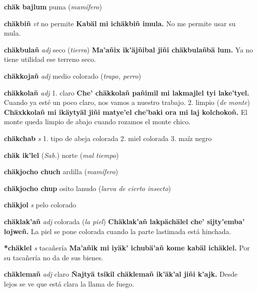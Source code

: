 \documentclass[10pt]{scrbook}
\newcommand{\entry}[1]{\textbf{#1}}
\newcommand{\onedefinition}[1]{#1.}
\newcommand{\partofspeech}[1]{\textit{#1}}
\newcommand{\spanishtranslation}[1]{#1}
\newcommand{\clarification}[1]{(\textit{#1})}
\newcommand{\cholexample}[1]{\textbf{#1}}
\newcommand{\exampletranslation}[1]{#1}
\newcommand{\relevantdialect}[1]{(\textit{#1})}
\begin{document}
\begin{multicols}{2}
\entry{chäk bajlum}
\spanishtranslation{puma}
\clarification{mamífero}

\entry{chäkbiñ}
\partofspeech{vt}
\spanishtranslation{no permite}
\cholexample{Kabäl mi ichäkbiñ imula.}
\exampletranslation{No me permite usar su mula.}

\entry{chäkbulañ}
\partofspeech{adj}
\spanishtranslation{seco}
\clarification{tierra}
\cholexample{Ma'añix ik'äjñibal jiñi chäkbulañbä lum.}
\exampletranslation{Ya no tiene utilidad ese terreno seco.}

\entry{chäkkojañ}
\partofspeech{adj}
\spanishtranslation{medio colorado}
\clarification{trapo, perro}

\entry{chäkkolañ}
\partofspeech{adj}
\onedefinition{1}
\spanishtranslation{claro}
\cholexample{Che' chäkkolañ pañimil mi lakmajlel tyi lake'tyel.}
\exampletranslation{Cuando ya esté un poco claro, nos vamos a nuestro trabajo.}
\onedefinition{2}
\spanishtranslation{limpio}
\clarification{de monte}
\cholexample{Chäxkkolañ mi ikäytyäl jiñi matye'el che'baki ora mi laj kolchokoñ.}
\exampletranslation{El monte queda limpio de abajo cuando rozamos el monte chico.}

\entry{chäkchab}
\partofspeech{s}
\onedefinition{1}
\spanishtranslation{tipo de abeja colorada}
\onedefinition{2}
\spanishtranslation{miel colorada}
\onedefinition{3}
\spanishtranslation{maíz negro}

\entry{chäk ik'lel}
\relevantdialect{Sab.}
\spanishtranslation{norte}
\clarification{mal tiempo}

\entry{chäkjocho chuch}
\spanishtranslation{ardilla}
\clarification{mamífero}

\entry{chäkjocho chup}
\spanishtranslation{osito lanudo}
\clarification{larva de cierto insecto}

\entry{chäkjol}
\partofspeech{s}
\spanishtranslation{pelo colorado}

\entry{chäklak'añ}
\partofspeech{adj}
\spanishtranslation{colorada}
\clarification{la piel}
\cholexample{Chäklak'añ lakpächälel che' sijty'emba' lojweñ.}
\exampletranslation{La piel se pone colorada cuando la parte lastimada está hinchada.}

\entry{*chäklel}
\partofspeech{s}
\spanishtranslation{tacañería}
\cholexample{Ma'añik mi iyäk' ichubä'añ kome kabäl ichäklel.}
\exampletranslation{Por su tacañería no da de sus bienes.}

\entry{chäklemañ}
\partofspeech{adj}
\spanishtranslation{claro}
\cholexample{Ñajtyä tsikil chäklemañ ik'äk'al jiñi k'ajk.}
\exampletranslation{Desde lejos se ve que está clara la llama de fuego.}


\end{multicols}
\end{document}
